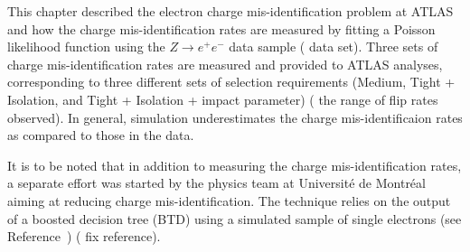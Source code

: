 This chapter described the electron charge mis-identification problem at ATLAS
and how the charge mis-identification rates are measured by fitting a Poisson
likelihood function using the $Z\to e^+e^-$ data sample ({\color{pink} data
		set}). Three sets of charge mis-identification rates are measured and provided
to ATLAS analyses, corresponding to three different sets of selection
requirements (Medium, Tight + Isolation, and Tight + Isolation + impact
parameter) ({\color{pink} the range of flip rates observed}). In general,
simulation underestimates the charge mis-identificaion rates as compared to
those in the data.

It is to be noted that in addition to measuring the charge mis-identification
rates, a separate effort was started by the physics team at Universit\'{e} de
Montr\'{e}al aiming at reducing charge mis-identification. The technique relies
on the output of a boosted decision tree (BTD) using a simulated sample of
single electrons (see Reference~\cite{atlaselcid}) ({\color{pink} fix
		reference}).
